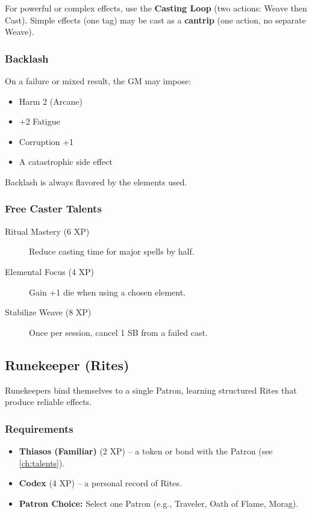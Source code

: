 For powerful or complex effects, use the \textbf{Casting Loop} (two actions: Weave then Cast). Simple effects (one tag) may be cast as a \textbf{cantrip} (one action, no separate Weave).

\subsubsection*{Backlash}
\label{sec:free-caster-backlash}
On a failure or mixed result, the GM may impose:
\begin{itemize}
  \item Harm 2 (Arcane)
  \item +2 Fatigue
  \item Corruption +1
  \item A catastrophic side effect
\end{itemize}
Backlash is always flavored by the elements used.

\subsubsection*{Free Caster Talents}
\label{sec:free-caster-talents}
\begin{description}
  \item[Ritual Mastery (6 XP)] Reduce casting time for major spells by half.
  \item[Elemental Focus (4 XP)] Gain +1 die when using a chosen element.
  \item[Stabilize Weave (8 XP)] Once per session, cancel 1 SB from a failed cast.
\end{description}

\subsection{Runekeeper (Rites)}
\label{sec:runekeeper}

Runekeepers bind themselves to a single Patron, learning structured Rites that produce reliable effects.

\subsubsection*{Requirements}
\begin{itemize}
  \item \textbf{Thiasos (Familiar)} (2 XP) -- a token or bond with the Patron (see \ref{ch:talents}).
  \item \textbf{Codex} (4 XP) -- a personal record of Rites.
  \item \textbf{Patron Choice:} Select one Patron (e.g., Traveler, Oath of Flame, Morag).
\end{itemize}

